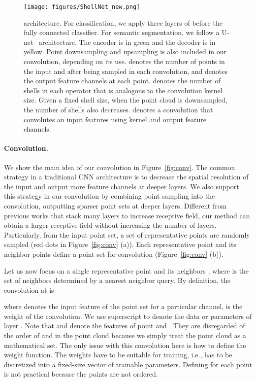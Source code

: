 \documentclass[10pt,twocolumn,letterpaper]{article}
\begin{document}
\begin{figure*}[t]
	\centering
	\texttt{[image: figures/ShellNet\_new.png]}	
	\caption{\ournet architecture. For classification, we apply three layers of \ourconv before the fully connected classifier. For semantic segmentation, we follow a U-net~\cite{ron2015unet} architecture. The encoder is in green and the decoder is in yellow. Point downsampling and upsampling is also included in our convolution, depending on its use.  denotes the number of points in the input and after being sampled in each convolution, and  denotes the output feature channels at each point.  denotes the number of shells in each \ourconv operator that is analogous to the convolution kernel size. Given a fixed shell size, when the point cloud is downsampled, the number of shells also decreases.   denotes a convolution that convolutes an input features using kernel  and output  feature channels.}
	\label{fig:net}
\end{figure*}

\paragraph{Convolution.}
We show the main idea of our convolution in Figure~\ref{fig:conv}. The common strategy in a traditional CNN architecture is to decrease the spatial resolution of the input and output more feature channels at deeper layers. We also support this strategy in our convolution by combining point sampling into the convolution, outputting sparser point sets at deeper layers. Different from previous works that stack many layers to increase receptive field, our method can obtain a larger receptive field without increasing the number of layers. Particularly, from the input point set, a set of representative points are randomly sampled (red dots in Figure~\ref{fig:conv} (a)). Each representative point and its neighbor points define a point set for convolution (Figure~\ref{fig:conv} (b)). 

Let us now focus on a single representative point  and its neighbors , where  is the set of neighbors determined by a nearest neighbor query.
By definition, the convolution at  is

where  denotes the input feature of the point set for a particular channel,  is the weight of the convolution. We use superscript  to denote the data or parameters of layer . Note that  and  denote the features of point  and . They are disregarded of the order of  and  in the point cloud because we simply treat the point cloud as a mathematical set. 
The only issue with this convolution here is how to define the weight function. The weights have to be suitable for training, i.e.,  has to be discretized into a fixed-size vector of trainable parameters. Defining  for each point is not practical because the points are not ordered.
\end{document}
